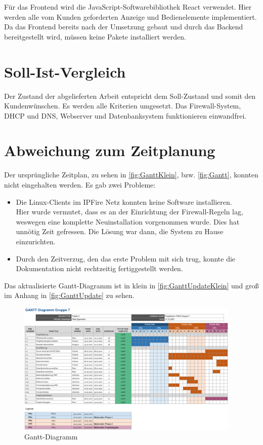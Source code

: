 \documentclass[a4paper,
    11pt,
    headings=small,
    ngerman,
    listof=totoc,
    numbers=noenddot]{scrreprt}[2021/11/13]
\begin{document}
Für das Frontend wird die JavaScript-Softwarebibliothek React verwendet. Hier werden alle vom Kunden geforderten Anzeige und Bedienelemente implementiert. Da das Frontend bereits nach der Umsetzung gebaut und durch das Backend bereitgestellt wird, müssen keine Pakete installiert werden.



\section{Soll-Ist-Vergleich}

Der Zustand der abgelieferten Arbeit entspricht dem Soll-Zustand und somit den Kundenwünschen. Es werden alle Kriterien umgesetzt. Das Firewall-System, DHCP und DNS, Webserver und Datenbanksystem funktionieren einwandfrei.



\section{Abweichung zum Zeitplanung}

Der ursprüngliche Zeitplan, zu sehen in \vref{fig:GanttKlein}, bzw. \vref{fig:Gantt}, konnten nicht eingehalten werden. Es gab zwei Probleme:

\begin{itemize}
  \item Die Linux-Clients im IPFire Netz konnten keine Software installieren. \\
        Hier wurde vermutet, dass es an der Einrichtung der Firewall-Regeln lag, weswegen eine komplette Neuinstallation vorgenommen wurde. Dies hat unnötig Zeit gefressen. Die Lösung war dann, die System zu Hause einzurichten.
  \item Durch den Zeitverzug, den das erste Problem mit sich trug, konnte die Dokumentation nicht rechtzeitig fertiggestellt werden.
\end{itemize}

Das aktualisierte Gantt-Diagramm ist in klein in \vref{fig:GanttUpdateKlein} und groß im Anhang in \vref{fig:GanttUpdate} zu sehen.

\begin{figure}[htbp]
  \centering
  \includegraphics[width=0.95\textwidth]{data/Gantt_Abschluss.png}
  \caption{Gantt-Diagramm}
  \label{fig:GanttUpdateKlein}
\end{figure}
\end{document}
